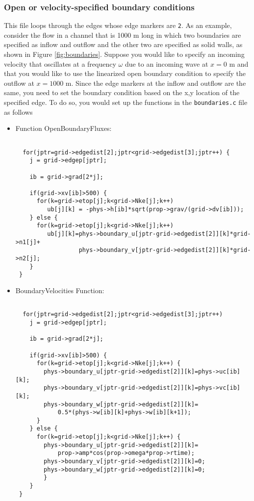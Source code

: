 \subsubsection{Open or velocity-specified boundary conditions}
This file loops through the edges whose edge markers are \verb+2+.  As an example, consider the flow in a 
channel that is 1000 m long in which two boundaries are specified as inflow and outflow and the other two 
are specified as solid walls, as shown in Figure \ref{fig:boundaries}.  
Suppose you would like to
specify an incoming velocity that oscillates at a frequency $\omega$ due to an incoming wave at $x=0$ m and that
you would like to use the linearized open boundary condition to specify the outflow at $x=1000$ m.  Since the
edge markers at the inflow and outflow are the same, you need to set the boundary condition based on the x,y
location of the specified edge.  To do so, you would set up the functions in the \verb+boundaries.c+ file as follows
\begin{itemize}
\item Function OpenBoundaryFluxes:
\begin{verbatim}

  for(jptr=grid->edgedist[2];jptr<grid->edgedist[3];jptr++) {
    j = grid->edgep[jptr];

    ib = grid->grad[2*j];

    if(grid->xv[ib]>500) {
      for(k=grid->etop[j];k<grid->Nke[j];k++) 
         ub[j][k] = -phys->h[ib]*sqrt(prop->grav/(grid->dv[ib]));
    } else {
      for(k=grid->etop[j];k<grid->Nke[j];k++) 
         ub[j][k]=phys->boundary_u[jptr-grid->edgedist[2]][k]*grid->n1[j]+
                  phys->boundary_v[jptr-grid->edgedist[2]][k]*grid->n2[j];
    }
 }

\end{verbatim}
\item BoundaryVelocities Function:
\begin{verbatim}

  for(jptr=grid->edgedist[2];jptr<grid->edgedist[3];jptr++) 
    j = grid->edgep[jptr];

    ib = grid->grad[2*j];

    if(grid->xv[ib]>500) {
      for(k=grid->etop[j];k<grid->Nke[j];k++) {
        phys->boundary_u[jptr-grid->edgedist[2]][k]=phys->uc[ib][k];
        phys->boundary_v[jptr-grid->edgedist[2]][k]=phys->vc[ib][k];
        phys->boundary_w[jptr-grid->edgedist[2]][k]=
            0.5*(phys->w[ib][k]+phys->w[ib][k+1]);
      } 
    } else {
      for(k=grid->etop[j];k<grid->Nke[j];k++) {
        phys->boundary_u[jptr-grid->edgedist[2]][k]=
            prop->amp*cos(prop->omega*prop->rtime);
        phys->boundary_v[jptr-grid->edgedist[2]][k]=0;
        phys->boundary_w[jptr-grid->edgedist[2]][k]=0;
        } 
    }
 }

\end{verbatim}
\end{itemize}
